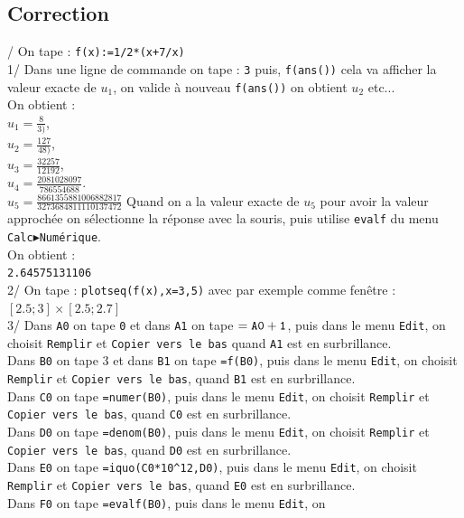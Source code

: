 \documentclass[a4paper,11pt]{book}
\begin{document}
\subsection{Correction}
/ On tape :
{\tt f(x):=1/2*(x+7/x)}\\
1/ Dans une ligne de commande on tape :
{\tt 3} puis,
{\tt f(ans())} cela va afficher la valeur exacte de $u_1$, on valide \`a 
nouveau {\tt f(ans())}  on obtient $u_2$ etc...\\ 
On obtient :\\
 $\displaystyle u_1=\frac{8}{3)}$,\\
 $\displaystyle u_2=\frac{127}{48)}$,\\
 $\displaystyle u_3=\frac{32257}{12192}$,\\
 $\displaystyle u_4=\frac{2081028097}{786554688}$.\\
 $\displaystyle u_5=\frac{8661355881006882817}{3273684811110137472}$ 
Quand on a la valeur exacte de $u_5$  pour avoir la 
valeur approch\'ee  on s\'electionne la r\'eponse avec la souris, puis utilise 
{\tt evalf} du menu {\tt Calc$\blacktriangleright$Num\'erique}.\\
On obtient :\\
{\tt 2.64575131106}\\
2/ On tape : {\tt plotseq(f(x),x=3,5)} avec par exemple comme fen\^etre : \\
$[2.5;3]\times [2.5;2.7]$\\
3/ Dans {\tt A0} on tape {\tt 0} et dans {\tt A1} on tape ${\tt =A0+1}$, puis 
dans le menu {\tt Edit}, on choisit {\tt Remplir} et {\tt Copier vers le bas}
quand {\tt A1} est en surbrillance.\\
 Dans {\tt B0} on tape 3 et dans {\tt B1} on tape {\tt =f(B0)}, puis 
dans le menu {\tt Edit}, on choisit {\tt Remplir} et {\tt Copier vers le bas}, 
quand {\tt B1} est en surbrillance.\\
Dans {\tt C0} on tape {\tt =numer(B0)}, puis dans le menu {\tt Edit}, on 
choisit {\tt Remplir}  et {\tt Copier vers le bas}, quand {\tt C0} est en 
surbrillance.\\
Dans {\tt D0} on tape {\tt =denom(B0)}, puis dans le menu {\tt Edit}, on 
choisit {\tt Remplir} et {\tt Copier vers le bas}, quand 
{\tt D0} est en surbrillance.\\
Dans {\tt E0} on tape {\tt =iquo(C0*10\verb|^|12,D0)}, puis dans le menu 
{\tt Edit}, on choisit {\tt Remplir} et {\tt Copier vers le bas},
quand {\tt E0} est en surbrillance.\\
Dans {\tt F0} on tape {\tt =evalf(B0)}, puis dans le menu {\tt Edit}, on 
\end{document}
